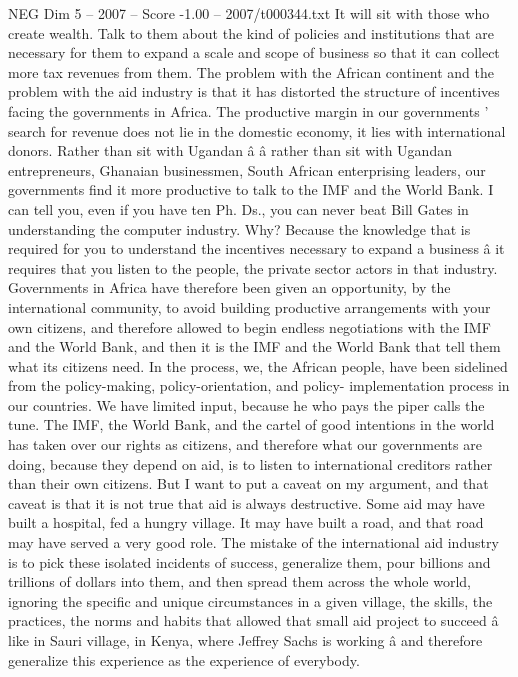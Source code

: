 \begin{textsample}{NEG Dim 5 – 2007 – Score -1.00 – 2007/t000344.txt}
It will sit with those who create wealth.
Talk to them about the kind of policies and institutions that are necessary for them to expand a scale and scope of business so that it can collect more tax revenues from them.
The problem with the African continent and the problem with the aid industry is that it has distorted the structure of incentives facing the governments in Africa.
The productive margin in our governments ' search for revenue does not lie in the domestic economy, it lies with international donors.
Rather than sit with Ugandan â â rather than sit with Ugandan entrepreneurs, Ghanaian businessmen, South African enterprising leaders, our governments find it more productive to talk to the IMF and the World Bank.
I can tell you, even if you have ten Ph.
Ds., you can never beat Bill Gates in understanding the computer industry.
Why?
Because the knowledge that is required for you to understand the incentives necessary to expand a business â it requires that you listen to the people, the private sector actors in that industry.
Governments in Africa have therefore been given an opportunity, by the international community, to avoid building productive arrangements with your own citizens, and therefore allowed to begin endless negotiations with the IMF and the World Bank, and then it is the IMF and the World Bank that tell them what its citizens need.
In the process, we, the African people, have been sidelined from the policy-making, policy-orientation, and policy- implementation process in our countries.
We have limited input, because he who pays the piper calls the tune.
The IMF, the World Bank, and the cartel of good intentions in the world has taken over our rights as citizens, and therefore what our governments are doing, because they depend on aid, is to listen to international creditors rather than their own citizens.
But I want to put a caveat on my argument, and that caveat is that it is not true that aid is always destructive.
Some aid may have built a hospital, fed a hungry village.
It may have built a road, and that road may have served a very good role.
The mistake of the international aid industry is to pick these isolated incidents of success, generalize them, pour billions and trillions of dollars into them, and then spread them across the whole world, ignoring the specific and unique circumstances in a given village, the skills, the practices, the norms and habits that allowed that small aid project to succeed â like in Sauri village, in Kenya, where Jeffrey Sachs is working â and therefore generalize this experience as the experience of everybody.

\end{textsample}

